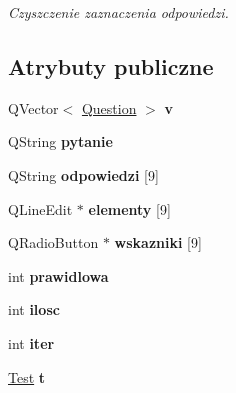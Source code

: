 \begin{DoxyCompactItemize}
\begin{DoxyCompactList}\small\item\em \-Czyszczenie zaznaczenia odpowiedzi. \end{DoxyCompactList}\end{DoxyCompactItemize}
\subsection*{\-Atrybuty publiczne}
\begin{DoxyCompactItemize}
\item 
\hypertarget{classMainWindow_ab7d893510725b5650c2721acc2064ca6}{\-Q\-Vector$<$ \hyperlink{classQuestion}{\-Question} $>$ {\bfseries v}}\label{classMainWindow_ab7d893510725b5650c2721acc2064ca6}

\item 
\hypertarget{classMainWindow_a1a95a51989740f7c24edc7aa6dbaf30f}{\-Q\-String {\bfseries pytanie}}\label{classMainWindow_a1a95a51989740f7c24edc7aa6dbaf30f}

\item 
\hypertarget{classMainWindow_a92415650f2bb0df7c43d2d840273bdf2}{\-Q\-String {\bfseries odpowiedzi} \mbox{[}9\mbox{]}}\label{classMainWindow_a92415650f2bb0df7c43d2d840273bdf2}

\item 
\hypertarget{classMainWindow_a0f8ea04c4f4ee5652871d2e2b18c886d}{\-Q\-Line\-Edit $\ast$ {\bfseries elementy} \mbox{[}9\mbox{]}}\label{classMainWindow_a0f8ea04c4f4ee5652871d2e2b18c886d}

\item 
\hypertarget{classMainWindow_ad60c262c75838d7e9783994cc7b9dd57}{\-Q\-Radio\-Button $\ast$ {\bfseries wskazniki} \mbox{[}9\mbox{]}}\label{classMainWindow_ad60c262c75838d7e9783994cc7b9dd57}

\item 
\hypertarget{classMainWindow_a12374eefc44270de129a688d9c7b1b6f}{int {\bfseries prawidlowa}}\label{classMainWindow_a12374eefc44270de129a688d9c7b1b6f}

\item 
\hypertarget{classMainWindow_a746a98e994149b6a25571420d3ac8321}{int {\bfseries ilosc}}\label{classMainWindow_a746a98e994149b6a25571420d3ac8321}

\item 
\hypertarget{classMainWindow_a3b35282a7f6b8dec87d1b3188e88154a}{int {\bfseries iter}}\label{classMainWindow_a3b35282a7f6b8dec87d1b3188e88154a}

\item 
\hypertarget{classMainWindow_a5a77efa8b70746191f1b77539f60f95d}{\hyperlink{classTest}{\-Test} {\bfseries t}}\label{classMainWindow_a5a77efa8b70746191f1b77539f60f95d}

\end{DoxyCompactItemize}


